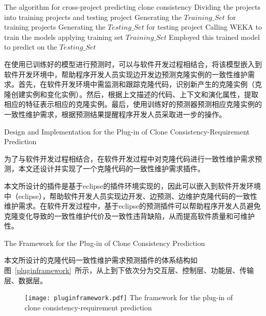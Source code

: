 \vspace{1em}
\begin{minipage}{0.8\textwidth}
\centering
\begin{algorithm}[H]
 {The algorithm for cross-project predicting clone consistency}
\label{alg-crossperdiction}
Dividing the projects into training projects and testing project\;
Generating the $Training\_{Set}$ for training projects\;
Generating the $Testing\_{Set}$ for testing project\;
Calling WEKA to train the models applying training set $Training\_{Set}$\;
Employed this trained model to predict on the $Testing\_{Set}$\;
\end{algorithm}
\end{minipage}
\vspace{1em}

在使用已训练好的模型进行预测时，可以与软件开发过程相结合，将该模型嵌入到软件开发环境中，帮助程序开发人员实现边开发边预测克隆实例的一致性维护需求。首先，在软件开发环境中需监测和跟踪克隆代码，识别新产生的克隆实例（克隆创建实例和变化实例）。然后，根据上文描述的代码、上下文和演化属性，提取相应的特征表示相应的克隆实例。最后，使用训练好的预测器预测相应克隆实例的一致性维护需求，根据预测结果提醒程序开发人员采取进一步的操作。

{Design and Implementation for the Plug-in of Clone Consistency-Requirement Prediction}

为了与软件开发过程相结合，在软件开发过程中对克隆代码进行一致性维护需求预测，本文还设计并实现了一个克隆代码的一致性维护需求插件。

本文所设计的插件是基于eclipse的插件环境实现的，因此可以嵌入到软件开发环境中（eclipse），帮助软件开发人员实现边开发、边预测、边维护克隆代码的一致性维护需求。在软件开发过程中，基于eclipse的预测插件可以帮助程序开发人员避免克隆变化导致的一致性维护代价及一致性违背缺陷，从而提高软件质量和可维护性。

{The Framework for the Plug-in of Clone Consistency Prediction}

本文所设计的克隆代码一致性维护需求预测插件的体系结构如图~\ref{pluginframework}~所示，从上到下依次分为交互层、控制层、功能层、传输层、数据层。

\begin{figure}[h]
\centering
\texttt{[image: pluginframework.pdf]}
{The framework for the plug-in of clone consistency-requirement prediction}
\vspace{-1em}
\end{figure}

